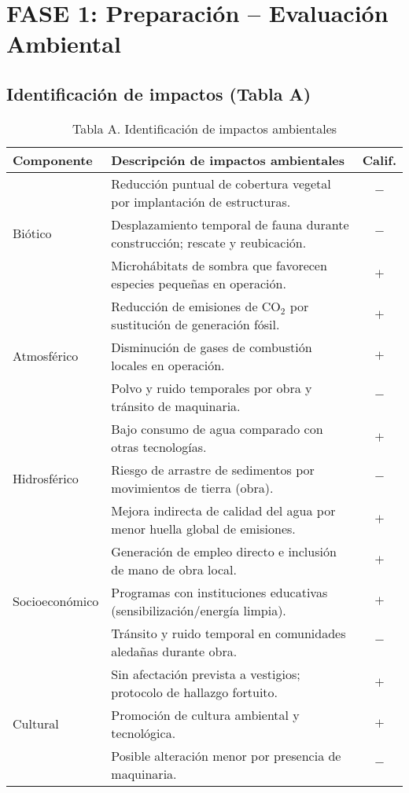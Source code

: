 \section{FASE 1: Preparación -- Evaluación Ambiental}
\subsection{Identificación de impactos (Tabla A)}
\begin{table}[h]
\centering
\caption{Tabla A. Identificación de impactos ambientales}
\begin{tabular}{|l|p{10cm}|c|}
\hline
\textbf{Componente} & \textbf{Descripción de impactos ambientales} & \textbf{Calif.}\\ \hline
\multirow{3}{*}{Biótico} 
& Reducción puntual de cobertura vegetal por implantación de estructuras. & $-$\\
& Desplazamiento temporal de fauna durante construcción; rescate y reubicación. & $-$\\
& Microhábitats de sombra que favorecen especies pequeñas en operación. & $+$\\ \hline
\multirow{3}{*}{Atmosférico} 
& Reducción de emisiones de CO$_2$ por sustitución de generación fósil. & $+$\\
& Disminución de gases de combustión locales en operación. & $+$\\
& Polvo y ruido temporales por obra y tránsito de maquinaria. & $-$\\ \hline
\multirow{3}{*}{Hidrosférico} 
& Bajo consumo de agua comparado con otras tecnologías. & $+$\\
& Riesgo de arrastre de sedimentos por movimientos de tierra (obra). & $-$\\
& Mejora indirecta de calidad del agua por menor huella global de emisiones. & $+$\\ \hline
\multirow{3}{*}{Socioeconómico} 
& Generación de empleo directo e inclusión de mano de obra local. & $+$\\
& Programas con instituciones educativas (sensibilización/energía limpia). & $+$\\
& Tránsito y ruido temporal en comunidades aledañas durante obra. & $-$\\ \hline
\multirow{3}{*}{Cultural} 
& Sin afectación prevista a vestigios; protocolo de hallazgo fortuito. & $+$\\
& Promoción de cultura ambiental y tecnológica. & $+$\\
& Posible alteración menor por presencia de maquinaria. & $-$\\ \hline

\end{tabular}
\end{table}
